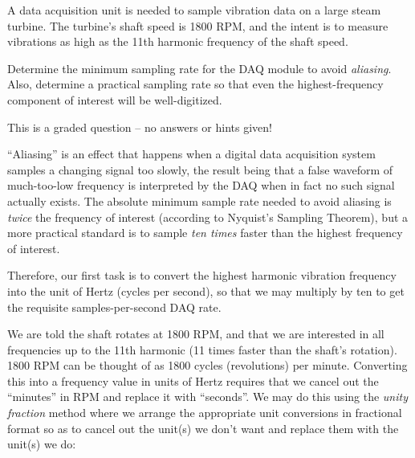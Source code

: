 

A data acquisition unit is needed to sample vibration data on a large steam turbine.  The turbine's shaft speed is 1800 RPM, and the intent is to measure vibrations as high as the 11th harmonic frequency of the shaft speed.

\vskip 10pt

Determine the minimum sampling rate for the DAQ module to avoid {\it aliasing}.  Also, determine a practical sampling rate so that even the highest-frequency component of interest will be well-digitized.

\vfil 

\eject






This is a graded question -- no answers or hints given!







``Aliasing'' is an effect that happens when a digital data acquisition system samples a changing signal too slowly, the result being that a false waveform of much-too-low frequency is interpreted by the DAQ when in fact no such signal actually exists.  The absolute minimum sample rate needed to avoid aliasing is {\it twice} the frequency of interest (according to Nyquist's Sampling Theorem), but a more practical standard is to sample {\it ten times} faster than the highest frequency of interest.

Therefore, our first task is to convert the highest harmonic vibration frequency into the unit of Hertz (cycles per second), so that we may multiply by ten to get the requisite samples-per-second DAQ rate.

\vskip 30pt

We are told the shaft rotates at 1800 RPM, and that we are interested in all frequencies up to the 11th harmonic (11 times faster than the shaft's rotation).  1800 RPM can be thought of as 1800 cycles (revolutions) per minute.  Converting this into a frequency value in units of Hertz requires that we cancel out the ``minutes'' in RPM and replace it with ``seconds''.  We may do this using the {\it unity fraction} method where we arrange the appropriate unit conversions in fractional format so as to cancel out the unit(s) we don't want and replace them with the unit(s) we do:

